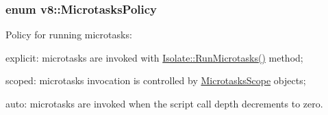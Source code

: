 \subsubsection[{\texorpdfstring{Microtasks\+Policy}{MicrotasksPolicy}}]{\setlength{\rightskip}{0pt plus 5cm}enum {\bf v8\+::\+Microtasks\+Policy}\hspace{0.3cm}{\ttfamily [strong]}}\hypertarget{namespacev8_a2f183b102b3d1b7a30a805e8c53c04da}{}\label{namespacev8_a2f183b102b3d1b7a30a805e8c53c04da}
Policy for running microtasks\+:
\begin{DoxyItemize}
\item explicit\+: microtasks are invoked with \hyperlink{classv8_1_1Isolate_ac3cbe2a1632eb863912640dcfc98b6c8}{Isolate\+::\+Run\+Microtasks()} method;
\item scoped\+: microtasks invocation is controlled by \hyperlink{classv8_1_1MicrotasksScope}{Microtasks\+Scope} objects;
\item auto\+: microtasks are invoked when the script call depth decrements to zero. 
\end{DoxyItemize}